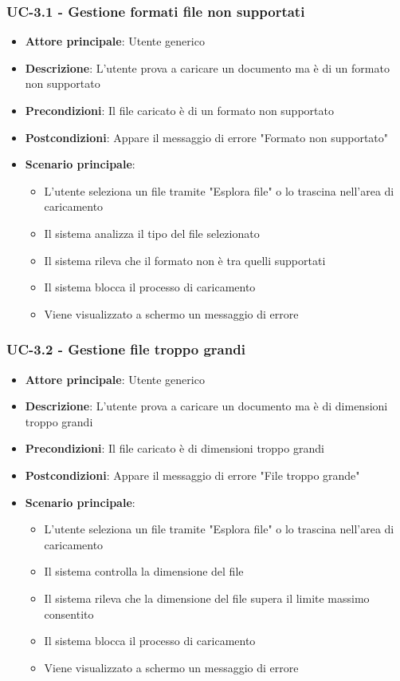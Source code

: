 \documentclass[11pt,a4paper]{article}
\begin{document}
\subsubsection{UC-3.1 - Gestione formati file non supportati}
\begin{itemize}
    \item \textbf{Attore principale}: Utente generico
    \item \textbf{Descrizione}: L'utente prova a caricare un documento ma è di un formato non supportato
    \item \textbf{Precondizioni}: Il file caricato è di un formato non supportato
    \item \textbf{Postcondizioni}: Appare il messaggio di errore "Formato non supportato"
    \item \textbf{Scenario principale}:
        \begin{itemize}
            \item L'utente seleziona un file tramite "Esplora file" o lo trascina nell'area di caricamento
            \item Il sistema analizza il tipo del file selezionato
            \item Il sistema rileva che il formato non è tra quelli supportati
            \item Il sistema blocca il processo di caricamento
            \item Viene visualizzato a schermo un messaggio di errore
        \end{itemize}
\end{itemize}

\subsubsection{UC-3.2 - Gestione file troppo grandi}
\begin{itemize}
    \item \textbf{Attore principale}: Utente generico
    \item \textbf{Descrizione}: L'utente prova a caricare un documento ma è di dimensioni troppo grandi
    \item \textbf{Precondizioni}: Il file caricato è di dimensioni troppo grandi
    \item \textbf{Postcondizioni}: Appare il messaggio di errore "File troppo grande"
    \item \textbf{Scenario principale}:
        \begin{itemize}
            \item L'utente seleziona un file tramite "Esplora file" o lo trascina nell'area di caricamento
            \item Il sistema controlla la dimensione del file
            \item Il sistema rileva che la dimensione del file supera il limite massimo consentito
            \item Il sistema blocca il processo di caricamento
            \item Viene visualizzato a schermo un messaggio di errore
        \end{itemize}
\end{itemize}
\end{document}
